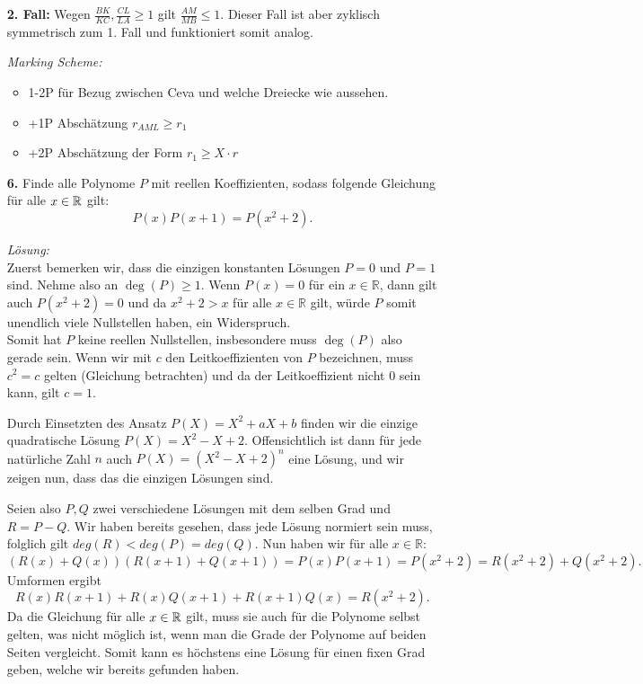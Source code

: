 \documentclass[language=german,style=solution]{smo}
\begin{document}
\begin{enumerate}
\textbf{2. Fall:} Wegen $\frac{BK}{KC},\frac{CL}{LA}\geq 1$ gilt $\frac{AM}{MB}\leq 1$. Dieser Fall ist aber zyklisch symmetrisch zum 1. Fall und funktioniert somit analog.

\textit{Marking Scheme:}
\begin{itemize}
\item 1-2P für Bezug zwischen Ceva und welche Dreiecke wie aussehen.
\item +1P Abschätzung $r_{AML} \geq r_1$
\item +2P Abschätzung der Form $r_1 \geq X \cdot r$
\end{itemize}

\newpage

\item[\textbf{6.}] %
Finde alle Polynome $P$ mit reellen Koeffizienten, sodass folgende Gleichung für alle $x \in \mathbb{R}$ gilt:
\[
P(x)P(x+1) = P ( x^2 + 2).
\]

\textit{Lösung:}\\
Zuerst bemerken wir, dass die einzigen konstanten Lösungen $P=0$ und $P=1$ sind. Nehme also an $\deg(P)\geq 1$. Wenn $P(x)=0$ für ein $x\in \mathbb{R}$, dann gilt auch $P(x^2+2)=0$ und da $x^2+2 > x$ für alle $x\in \mathbb{R}$ gilt, würde $P$ somit unendlich viele Nullstellen haben, ein Widerspruch.\\
Somit hat $P$ keine reellen Nullstellen, insbesondere muss $\deg(P)$ also gerade sein. Wenn wir mit $c$ den Leitkoeffizienten von $P$ bezeichnen, muss $c^2=c$ gelten (Gleichung betrachten) und da der Leitkoeffizient nicht $0$ sein kann, gilt $c=1$.

Durch Einsetzten des Ansatz $P(X)=X^2+aX+b$ finden wir die einzige quadratische Lösung $P(X)=X^2-X+2$. Offensichtlich ist dann für jede natürliche Zahl $n$ auch $P(X)=(X^2-X+2)^n$ eine Lösung, und wir zeigen nun, dass das die einzigen Lösungen sind.

Seien also $P,Q$ zwei verschiedene Lösungen mit dem selben Grad und $R = P - Q$. Wir haben bereits gesehen, dass jede Lösung normiert sein muss, folglich gilt $deg(R) < deg(P)=deg(Q).$ Nun haben wir für alle $x \in\mathbb{R}$:
\[
(R(x)+Q(x))(R(x+1)+Q(x+1))=P(x)P(x+1)=P(x^2+2)= R(x^2+2) + Q(x^2+2).
\]
Umformen ergibt
\[
R(x)R(x+1)+R(x)Q(x+1)+R(x+1)Q(x)=R(x^2+2).
\]
Da die Gleichung für alle $x\in\mathbb{R}$ gilt, muss sie auch für die Polynome selbst gelten, was nicht möglich ist, wenn man die Grade der Polynome auf beiden Seiten vergleicht. Somit kann es höchstens eine Lösung für einen fixen Grad geben, welche wir bereits gefunden haben.


\end{enumerate}
\end{document}
